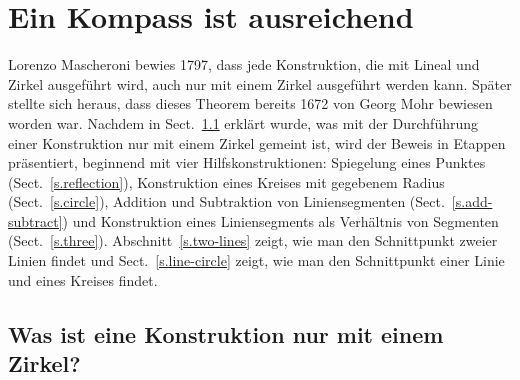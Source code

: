 
\chapter{Ein Kompass ist ausreichend}\label{c.compass}


Lorenzo Mascheroni bewies 1797, dass jede Konstruktion, die mit Lineal und Zirkel ausgeführt wird, auch nur mit einem Zirkel ausgeführt werden kann. Später stellte sich heraus, dass dieses Theorem bereits 1672 von Georg Mohr bewiesen worden war.
Nachdem in Sect.~\ref{s.compass-what} erklärt wurde, was mit der Durchführung einer Konstruktion nur mit einem Zirkel gemeint ist, wird der Beweis in Etappen präsentiert, beginnend mit vier Hilfskonstruktionen: Spiegelung eines Punktes (Sect.~\ref{s.reflection}), Konstruktion eines Kreises mit gegebenem Radius (Sect.~\ref{s.circle}), Addition und Subtraktion von Liniensegmenten (Sect.~\ref{s.add-subtract}) und Konstruktion eines Liniensegments als Verhältnis von Segmenten (Sect.~\ref{s.three}). Abschnitt~\ref{s.two-lines} zeigt, wie man den Schnittpunkt zweier Linien findet und Sect.~\ref{s.line-circle} zeigt, wie man den Schnittpunkt einer Linie und eines Kreises findet.


\section{Was ist eine Konstruktion nur mit einem Zirkel?}\label{s.compass-what}

